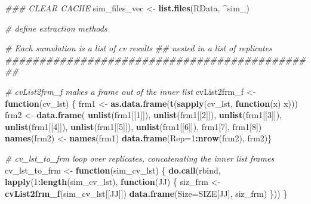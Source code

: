 \documentclass[
]{book}
\newenvironment{Shaded}{\begin{snugshade}}{\end{snugshade}}
\newcommand{\CommentTok}[1]{\textcolor[rgb]{0.56,0.35,0.01}{\textit{#1}}}
\newcommand{\ControlFlowTok}[1]{\textcolor[rgb]{0.13,0.29,0.53}{\textbf{#1}}}
\newcommand{\DataTypeTok}[1]{\textcolor[rgb]{0.13,0.29,0.53}{#1}}
\newcommand{\DecValTok}[1]{\textcolor[rgb]{0.00,0.00,0.81}{#1}}
\newcommand{\KeywordTok}[1]{\textcolor[rgb]{0.13,0.29,0.53}{\textbf{#1}}}
\newcommand{\NormalTok}[1]{#1}
\newcommand{\OperatorTok}[1]{\textcolor[rgb]{0.81,0.36,0.00}{\textbf{#1}}}
\newcommand{\StringTok}[1]{\textcolor[rgb]{0.31,0.60,0.02}{#1}}
\begin{document}
\begin{Shaded}
\begin{Highlighting}[]
\CommentTok{\#\#\# CLEAR CACHE}
\NormalTok{sim\_files\_vec <{-}}\StringTok{ }\KeywordTok{list.files}\NormalTok{(}\StringTok{\textquotesingle{}RData\textquotesingle{}}\NormalTok{, }\StringTok{\textquotesingle{}\^{}sim\_\textquotesingle{}}\NormalTok{)}


\CommentTok{\# define extraction methods}

\CommentTok{\# Each sumulation is a list of cv results }
\CommentTok{\#\# nested in a list of replicates}
\CommentTok{\#\#\#\#\#\#\#\#\#\#\#\#\#\#\#\#\#\#\#\#\#\#\#\#\#\#\#\#\#\#\#\#\#\#\#\#\#\#\#\#\#\#\#\#\#\#}

\CommentTok{\# cvList2frm\_f makes a frame out of the inner list}
\NormalTok{cvList2frm\_f <{-}}\StringTok{ }\ControlFlowTok{function}\NormalTok{(cv\_lst) \{}
\NormalTok{ frm1 <{-}}\StringTok{ }\KeywordTok{as.data.frame}\NormalTok{(}\KeywordTok{t}\NormalTok{(}\KeywordTok{sapply}\NormalTok{(cv\_lst, }\ControlFlowTok{function}\NormalTok{(x) x)))}
\NormalTok{ frm2 <{-}}\StringTok{ }\KeywordTok{data.frame}\NormalTok{(}
  \KeywordTok{unlist}\NormalTok{(frm1[[}\DecValTok{1}\NormalTok{]]), }\KeywordTok{unlist}\NormalTok{(frm1[[}\DecValTok{2}\NormalTok{]]),}
  \KeywordTok{unlist}\NormalTok{(frm1[[}\DecValTok{3}\NormalTok{]]), }\KeywordTok{unlist}\NormalTok{(frm1[[}\DecValTok{4}\NormalTok{]]),}
  \KeywordTok{unlist}\NormalTok{(frm1[[}\DecValTok{5}\NormalTok{]]), }\KeywordTok{unlist}\NormalTok{(frm1[[}\DecValTok{6}\NormalTok{]]),}
\NormalTok{  frm1[}\DecValTok{7}\NormalTok{], frm1[}\DecValTok{8}\NormalTok{])}
  \KeywordTok{names}\NormalTok{(frm2) <{-}}\StringTok{ }\KeywordTok{names}\NormalTok{(frm1)}
  \KeywordTok{data.frame}\NormalTok{(}\DataTypeTok{Rep=}\DecValTok{1}\OperatorTok{:}\KeywordTok{nrow}\NormalTok{(frm2), frm2)\}}

\CommentTok{\# cv\_lst\_to\_frm loop over replicates, concatenating the inner list frames}
\NormalTok{cv\_lst\_to\_frm <{-}}\StringTok{ }\ControlFlowTok{function}\NormalTok{(sim\_cv\_lst) \{}
 \KeywordTok{do.call}\NormalTok{(}\StringTok{\textquotesingle{}rbind\textquotesingle{}}\NormalTok{, }\KeywordTok{lapply}\NormalTok{(}\DecValTok{1}\OperatorTok{:}\KeywordTok{length}\NormalTok{(sim\_cv\_lst),}
  \ControlFlowTok{function}\NormalTok{(JJ) \{}
\NormalTok{    siz\_frm <{-}}\StringTok{ }\KeywordTok{cvList2frm\_f}\NormalTok{(sim\_cv\_lst[[JJ]])}
    \KeywordTok{data.frame}\NormalTok{(}\DataTypeTok{Size=}\NormalTok{SIZE[JJ], siz\_frm)}
\NormalTok{  \}))}
\NormalTok{\}}


\end{Highlighting}
\end{Shaded}
\end{document}
